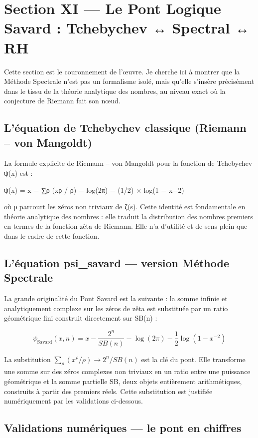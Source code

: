 \documentclass[11pt,a4paper]{article}
\begin{document}
\section{Section XI — Le Pont Logique Savard : Tchebychev ↔ Spectral ↔ RH}
Cette section est le couronnement de l'œuvre. Je cherche ici à montrer que la Méthode Spectrale n'est pas un formalisme isolé, mais qu'elle s'insère précisément dans le tissu de la théorie analytique des nombres, au niveau exact où la conjecture de Riemann fait son nœud.

\subsection{L'équation de Tchebychev classique (Riemann – von Mangoldt)}

La formule explicite de Riemann – von Mangoldt pour la fonction de Tchebychev ψ(x) est :

ψ(x) = x − ∑ρ (xρ / ρ) − log(2π) − (1/2) × log(1 − x−2)

où ρ parcourt les zéros non triviaux de ζ(s). Cette identité est fondamentale en théorie analytique des nombres : elle traduit la distribution des nombres premiers en termes de la fonction zêta de Riemann. Elle n'a d'utilité et de sens plein que dans le cadre de cette fonction.

\subsection{L'équation psi\_savard — version Méthode Spectrale}

La grande originalité du Pont Savard est la suivante : la somme infinie et analytiquement complexe sur les zéros de zêta est substituée par un ratio géométrique fini construit directement sur SB(n) :

\[
\psi_{\mathrm{Savard}}(x,n)=x-\frac{2^{n}}{SB(n)}-\log(2\pi)-\frac{1}{2}\log(1-x^{-2})
\]

La substitution $\sum_{\rho}(x^{\rho}/\rho) \to 2^{n}/SB(n)$ est la clé du pont. Elle transforme une somme sur des zéros complexes non triviaux en un ratio entre une puissance géométrique et la somme partielle SB, deux objets entièrement arithmétiques, construits à partir des premiers réels. Cette substitution est justifiée numériquement par les validations ci-dessous.

\subsection{Validations numériques — le pont en chiffres}
\end{document}
